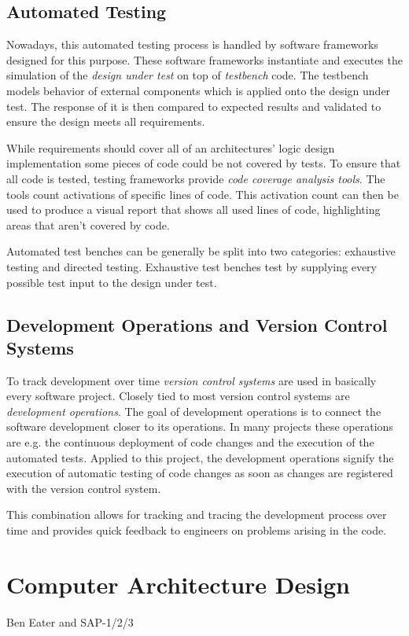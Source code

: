 \subsection{Automated Testing}
Nowadays, this automated testing process is handled by software frameworks designed for this purpose. These software frameworks instantiate and executes the simulation of the \textit{design under test} on top of \textit{testbench} code. The testbench models behavior of external components which is applied onto the design under test. The response of it is then compared to expected results and validated to ensure the design meets all requirements.

While requirements should cover all of an architectures' logic design implementation some pieces of code could be not covered by tests. To ensure that all code is tested, testing frameworks provide \textit{code coverage analysis tools}. The tools count activations of specific lines of code. This activation count can then be used to produce a visual report that shows all used lines of code, highlighting areas that aren't covered by code.

Automated test benches can be generally be split into two categories: exhaustive testing and directed testing. Exhaustive test benches test by supplying every possible test input to the design under test. 

\cite{verilogtestbenches} \cite{exhaustivetesting} \cite{directedtesting}


\subsection{Development Operations and Version Control Systems}
To track development over time \textit{version control systems} are used in basically every software project. Closely tied to most version control systems are \textit{development operations}. The goal of development operations is to connect the software development closer to its operations. In many projects these operations are e.g. the continuous deployment of code changes and the execution of the automated tests. Applied to this project, the development operations signify the execution of automatic testing of code changes as soon as changes are registered with the version control system. 

This combination allows for tracking and tracing the development process over time and provides quick feedback to engineers on problems arising in the code.

\section{Computer Architecture Design}
Ben Eater and SAP-1/2/3
